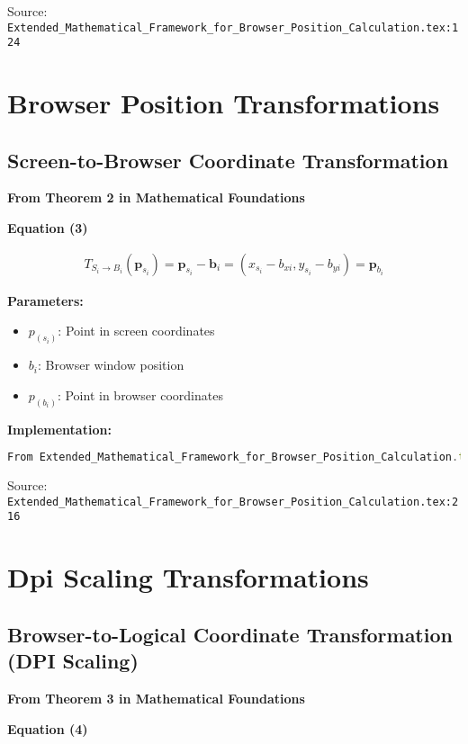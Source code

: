 \documentclass{article}
\begin{document}
Source: \texttt{Extended_Mathematical_Framework_for_Browser_Position_Calculation.tex:124}

\section{Browser Position Transformations}

\subsection{Screen-to-Browser Coordinate Transformation}

\textbf{From Theorem 2 in Mathematical Foundations}

\textbf{Equation (3)}

\begin{align}
T_{S_i \to B_i}(\bm{p}_{s_i}) = \bm{p}_{s_i} - \bm{b}_i = (x_{s_i} - b_{xi}, y_{s_i} - b_{yi}) = \bm{p}_{b_i}
\end{align}

\textbf{Parameters:}

\begin{itemize}
\item $p_(s_i)$: Point in screen coordinates
\item $b_i$: Browser window position
\item $p_(b_i)$: Point in browser coordinates
\end{itemize}

\textbf{Implementation:}

\begin{lstlisting}[language=TypeScript, basicstyle=\small\ttfamily]
From Extended_Mathematical_Framework_for_Browser_Position_Calculation.tex
\end{lstlisting}

Source: \texttt{Extended_Mathematical_Framework_for_Browser_Position_Calculation.tex:216}

\section{Dpi Scaling Transformations}

\subsection{Browser-to-Logical Coordinate Transformation (DPI Scaling)}

\textbf{From Theorem 3 in Mathematical Foundations}

\textbf{Equation (4)}
\end{document}

